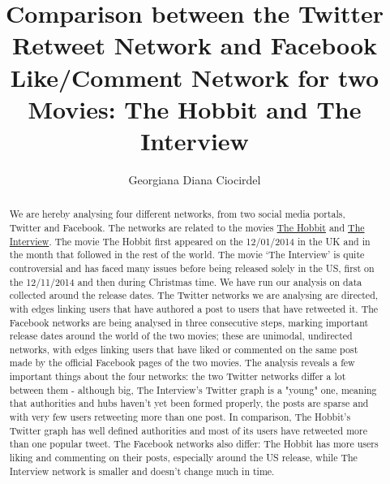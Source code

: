 \documentclass{llncs}
\begin{document}
\title{Comparison between the Twitter Retweet Network and Facebook Like/Comment
Network for two Movies: The Hobbit and The Interview}
\author{Georgiana Diana Ciocirdel}
\maketitle
%
\begin{abstract}
We are hereby analysing four different networks, from two social media portals,
Twitter and Facebook. The networks are related to the movies
\href{http://www.thehobbit.com/}{The Hobbit} and
\href{http://www.theinterview-movie.com/}{The Interview}. The movie The Hobbit
first appeared on the 12/01/2014 in the UK and in the month that followed in the
rest of the world. The movie ‘The Interview’ is quite controversial and has
faced many issues before being released solely in the US, first on the
12/11/2014 and then during Christmas time. We have run our analysis on data
collected around the release dates. The Twitter networks we are analysing are
directed, with edges linking users that have authored a post to users that have
retweeted it. The Facebook networks are being analysed in three consecutive
steps, marking important release dates around the world of the two movies; these
are unimodal, undirected networks, with edges linking users that have liked or
commented on the same post made by the official Facebook pages of the two
movies. The analysis reveals a few important things about the four networks: the
two Twitter networks differ a lot between them - although big, The Interview's
Twitter graph is a "young" one, meaning that authorities and hubs haven't yet
been formed properly, the posts are sparse and with very few users retweeting
more than one post. In comparison, The Hobbit's Twitter graph has well defined
authorities and most of its users have retweeted more than one popular tweet.
The Facebook networks also differ: The Hobbit has more users liking and
commenting on their posts, especially around the US release, while The Interview
network is smaller and doesn't change much in time.
\end{abstract}
%
\end{document}
